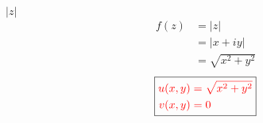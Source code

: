 \item[4.] $|z|$
\begin{align*}
    f(z) 
    &= |z| \\
    &= |x+iy| \\
    &= \sqrt{x^2+y^2}
\end{align*}
\[
\boxed{
\textcolor{red}{
\begin{aligned}
u(x,y) &= \sqrt{x^2+y^2} \\
v(x,y) &= 0
\end{aligned}
}
}
\]
